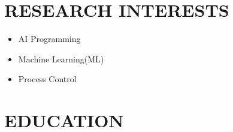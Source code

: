 \documentclass[10pt,a4paper,sans]{moderncv} %
\begin{document}
	
	\makecvtitle
	
	\section{RESEARCH INTERESTS}

		\begin{multicols}{3}
		   \begin{itemize}
		    \item AI Programming
		     \item Machine Learning(ML)
		     
		   \end{itemize}
		
		      \begin{itemize}
		       \item Process Control
		       
		      \end{itemize}
		 \end{multicols}    

	
	\vspace{-0.9em}
	
	\section{EDUCATION}
	
\end{document}
